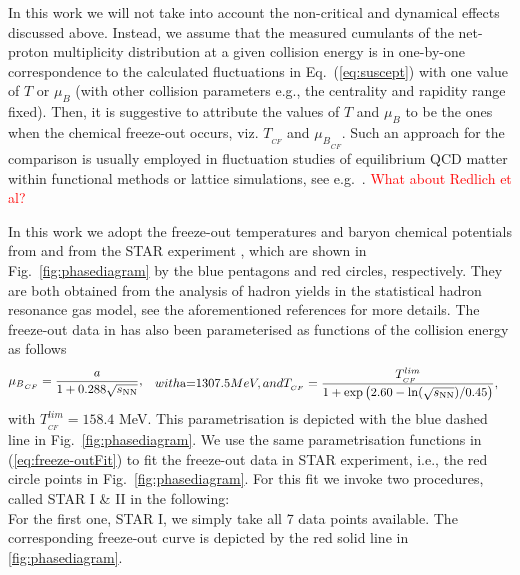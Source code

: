 \documentclass[%
reprint,
superscriptaddress,
showpacs,preprintnumbers,
amsmath,amssymb,
aps,
prd,
]{revtex4-1}
\def\Fig#1{Fig.~\ref{#1}} \def\Tab#1{Tab.~\ref{#1}}
\def\Eq#1{Eq.~(\ref{#1})}
\def\eq#1{(\ref{#1})}
\newcommand{\coljan}[1]{\textcolor{red}{#1}}
\begin{document}
In this work we will not take into account the non-critical and dynamical effects discussed above. Instead, we assume that the measured cumulants of the net-proton multiplicity distribution at a given collision energy is in one-by-one correspondence to the calculated fluctuations in \Eq{eq:suscept} with one value of $T$ or $\mu_B$ (with other collision parameters e.g., the centrality and rapidity range fixed). Then, it is suggestive to attribute the values of $T$ and $\mu_B$ to be the ones when the chemical freeze-out occurs, viz. $T_{_{CF}}$ and ${\mu_B}_{_{CF}}$. Such an approach for the comparison is usually employed in fluctuation studies of equilibrium QCD matter within functional methods or lattice simulations, see e.g.\ \cite{Fu:2015amv, Fu:2016tey, Isserstedt:2019pgx, Bazavov:2020bjn}. \coljan{What about Redlich et al?}

In this work we adopt the freeze-out temperatures and baryon chemical potentials from \cite{Andronic:2017pug} and from the STAR experiment \cite{Adamczyk:2017iwn}, which are shown in \Fig{fig:phasediagram} by the blue pentagons and red circles, respectively. They are both obtained from the analysis of hadron yields in the statistical hadron resonance gas model, see the  aforementioned references for more details. The freeze-out data in \cite{Andronic:2017pug} has also been parameterised as functions of the collision energy as follows 
%
\begin{subequations}\label{eq:freeze-outFit}
%
\begin{align}
{\mu_B}_{_{CF}}&=\frac{a}{1+0.288\sqrt{s_{\mathrm{NN}}}},\label{eq:muBCFparatri}
\end{align}
%
with $a=1307.5$ MeV, and
%
\begin{align}
T_{_{CF}}&=\frac{T^{lim}_{_{CF}}}{1+\exp\big(2.60-\ln(\sqrt{s_{\mathrm{NN}}})/0.45\big)},\label{eq:TCFparatri}
\end{align}
%
\end{subequations}
%
with $T^{lim}_{_{CF}}=158.4$ MeV. This parametrisation is depicted with the blue dashed line in \Fig{fig:phasediagram}. We use the same parametrisation functions in \eq{eq:freeze-outFit} to fit the freeze-out data in STAR experiment, i.e., the red circle points in \Fig{fig:phasediagram}. For this fit we invoke two procedures, called STAR I \& II in the following: \\[-2ex] 
For the first one, STAR I, we simply take all 7 data points available. The corresponding freeze-out curve is depicted by the red solid line in \autoref{fig:phasediagram}. 
\end{document}
